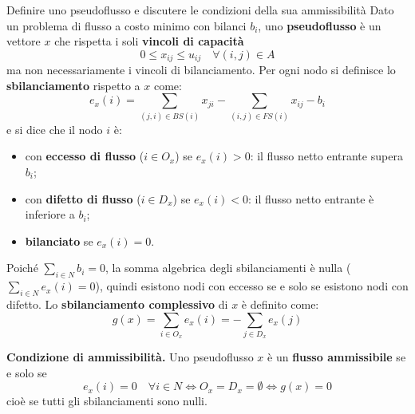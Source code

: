 \documentclass[12pt]{extarticle} %
\begin{document}
\begin{teoriabox}{Definire uno pseudoflusso e discutere le condizioni della sua ammissibilità}
Dato un problema di flusso a costo minimo con bilanci $b_i$, uno \textbf{pseudoflusso} è un vettore $x$ che rispetta i soli \textbf{vincoli di capacità} %
\[
0 \le x_{ij} \le u_{ij} \quad \forall (i,j)\in A
\] %
ma non necessariamente i vincoli di bilanciamento. Per ogni nodo si definisce lo \textbf{sbilanciamento} rispetto a $x$ come: %
\[
e_x(i) = \sum_{(j,i)\in BS(i)} x_{ji} - \sum_{(i,j)\in FS(i)} x_{ij} - b_i
\] %
e si dice che il nodo $i$ è:
\begin{itemize}
    \item con \textbf{eccesso di flusso} ($i \in O_x$) se $e_x(i) > 0$: il flusso netto entrante supera $b_i$; %
    \item con \textbf{difetto di flusso} ($i \in D_x$) se $e_x(i) < 0$: il flusso netto entrante è inferiore a $b_i$; %
    \item \textbf{bilanciato} se $e_x(i) = 0$. %
\end{itemize}
Poiché $\sum_{i \in N} b_i = 0$, la somma algebrica degli sbilanciamenti è nulla ($\sum_{i \in N} e_x(i) = 0$), quindi esistono nodi con eccesso se e solo se esistono nodi con difetto. Lo \textbf{sbilanciamento complessivo} di $x$ è definito come: %
\[
g(x) = \sum_{i \in O_x} e_x(i) = -\sum_{j \in D_x} e_x(j)
\] %

\noindent\textbf{Condizione di ammissibilità.} Uno pseudoflusso $x$ è un \textbf{flusso ammissibile} se e solo se %
\[
e_x(i) = 0 \quad \forall i \in N \iff O_x = D_x = \emptyset \iff g(x) = 0
\] %
cioè se tutti gli sbilanciamenti sono nulli.
\end{teoriabox}

\end{document}
